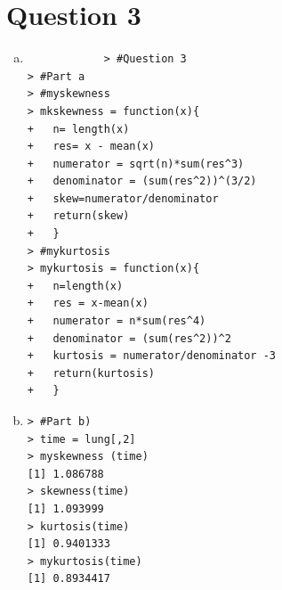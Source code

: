\documentclass[a4paper,11pt]{article}
\begin{document}
	\section*{Question 3}
	\begin{enumerate}[(a)]
	\item
		\begin{verbatim}
			> #Question 3
> #Part a
> #myskewness
> mkskewness = function(x){
+ 	n= length(x)
+ 	res= x - mean(x)
+ 	numerator = sqrt(n)*sum(res^3)
+ 	denominator = (sum(res^2))^(3/2)
+ 	skew=numerator/denominator
+ 	return(skew)
+ 	}
> #mykurtosis
> mykurtosis = function(x){
+ 	n=length(x)
+ 	res = x-mean(x)
+ 	numerator = n*sum(res^4)
+ 	denominator = (sum(res^2))^2
+ 	kurtosis = numerator/denominator -3
+ 	return(kurtosis)
+ 	}
\end{verbatim}
\item
\begin{verbatim}
> #Part b)
> time = lung[,2]
> myskewness (time)
[1] 1.086788
> skewness(time)
[1] 1.093999
> kurtosis(time)
[1] 0.9401333
> mykurtosis(time)
[1] 0.8934417


\end{verbatim}
\end{enumerate}
\end{document}
